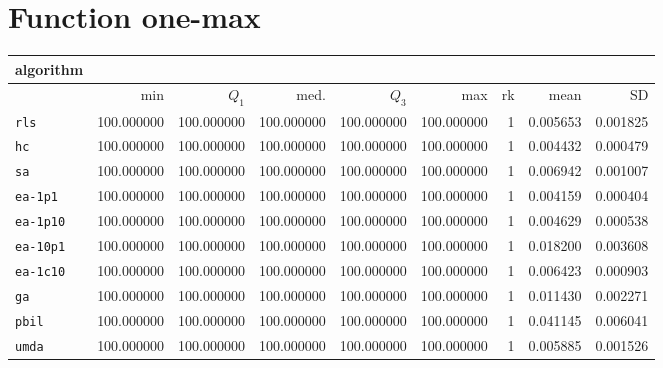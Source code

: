 \section{Function one-max}
\begin{center}
\begin{tabular}{@{}l*{5}{>{{}}N{3}{0}}>{{}}N{2}{0}N{1}{3}N{1}{3}@{}}
\toprule
{algorithm} &  &  \\
\midrule
& {min} & {$Q_1$} & {med.} & {$Q_3$} & {max} & {rk} & {mean} & {SD} \\
\midrule
\verb|rls| & {\color{blue}} 100.000000 & {\color{blue}} 100.000000 & {\color{blue}} 100.000000 & {\color{blue}} 100.000000 & {\color{blue}} 100.000000 & 1 & 0.005653 & 0.001825 \\
 \verb|hc| & {\color{blue}} 100.000000 & {\color{blue}} 100.000000 & {\color{blue}} 100.000000 & {\color{blue}} 100.000000 & {\color{blue}} 100.000000 & 1 & 0.004432 & 0.000479 \\
 \verb|sa| & {\color{blue}} 100.000000 & {\color{blue}} 100.000000 & {\color{blue}} 100.000000 & {\color{blue}} 100.000000 & {\color{blue}} 100.000000 & 1 & 0.006942 & 0.001007 \\
 \verb|ea-1p1| & {\color{blue}} 100.000000 & {\color{blue}} 100.000000 & {\color{blue}} 100.000000 & {\color{blue}} 100.000000 & {\color{blue}} 100.000000 & 1 & 0.004159 & 0.000404 \\
 \verb|ea-1p10| & {\color{blue}} 100.000000 & {\color{blue}} 100.000000 & {\color{blue}} 100.000000 & {\color{blue}} 100.000000 & {\color{blue}} 100.000000 & 1 & 0.004629 & 0.000538 \\
 \verb|ea-10p1| & {\color{blue}} 100.000000 & {\color{blue}} 100.000000 & {\color{blue}} 100.000000 & {\color{blue}} 100.000000 & {\color{blue}} 100.000000 & 1 & 0.018200 & 0.003608 \\
 \verb|ea-1c10| & {\color{blue}} 100.000000 & {\color{blue}} 100.000000 & {\color{blue}} 100.000000 & {\color{blue}} 100.000000 & {\color{blue}} 100.000000 & 1 & 0.006423 & 0.000903 \\
 \verb|ga| & {\color{blue}} 100.000000 & {\color{blue}} 100.000000 & {\color{blue}} 100.000000 & {\color{blue}} 100.000000 & {\color{blue}} 100.000000 & 1 & 0.011430 & 0.002271 \\
 \verb|pbil| & {\color{blue}} 100.000000 & {\color{blue}} 100.000000 & {\color{blue}} 100.000000 & {\color{blue}} 100.000000 & {\color{blue}} 100.000000 & 1 & 0.041145 & 0.006041 \\
 \verb|umda| & {\color{blue}} 100.000000 & {\color{blue}} 100.000000 & {\color{blue}} 100.000000 & {\color{blue}} 100.000000 & {\color{blue}} 100.000000 & 1 & 0.005885 & 0.001526 \\
 \bottomrule
\end{tabular}
\end{center}


